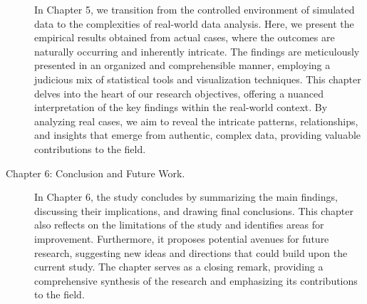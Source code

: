 \begin{description}
In Chapter 5, we transition from the controlled environment of simulated data to the complexities of real-world data analysis. Here, we present the empirical results obtained from actual cases, where the outcomes are naturally occurring and inherently intricate. The findings are meticulously presented in an organized and comprehensible manner, employing a judicious mix of statistical tools and visualization techniques. This chapter delves into the heart of our research objectives, offering a nuanced interpretation of the key findings within the real-world context. By analyzing real cases, we aim to reveal the intricate patterns, relationships, and insights that emerge from authentic, complex data, providing valuable contributions to the field.
\item [Chapter 6: Conclusion and Future Work.]
In Chapter 6, the study concludes by summarizing the main findings, discussing their implications, and drawing final conclusions. This chapter also reflects on the limitations of the study and identifies areas for improvement. Furthermore, it proposes potential avenues for future research, suggesting new ideas and directions that could build upon the current study. The chapter serves as a closing remark, providing a comprehensive synthesis of the research and emphasizing its contributions to the field.
\end{description}

